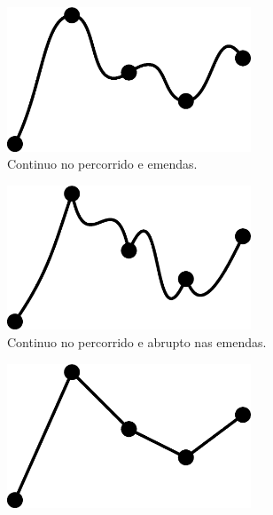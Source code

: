\begin{figure}[!h]
     \centering
     \begin{subfigure}[b]{0.4\textwidth}
         \centering
         \includegraphics[width=0.8\textwidth]{chapters/cap-musicalidade/continudade-a.eps}
         \caption{Continuo no percorrido e emendas.}
         \label{fig:continudade-a}
     \end{subfigure}
     \hfill
     \begin{subfigure}[b]{0.4\textwidth}
         \centering
         \includegraphics[width=0.8\textwidth]{chapters/cap-musicalidade/continudade-b.eps}
         \caption{Continuo no percorrido e abrupto nas emendas.}
         \label{fig:continudade-b}
     \end{subfigure}
     \hfill
     \begin{subfigure}[b]{0.4\textwidth}
         \centering
         \includegraphics[width=0.8\textwidth]{chapters/cap-musicalidade/continudade-c.eps}

\end{subfigure}
\end{figure}
